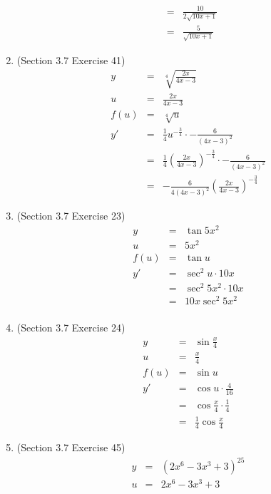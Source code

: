 \documentclass{article}
\begin{document}
\begin{enumerate}
\begin{eqnarray}
               &=& \frac{10}{2\sqrt{10x + 1}} \\
               &=& \frac{5}{\sqrt{10x + 1}}
        \end{eqnarray}
    \item (Section 3.7 Exercise 41)
        \begin{eqnarray}
            y &=& \sqrt[4]{\frac{2x}{4x-3}} \\
            u &=& \frac{2x}{4x-3} \\
            f(u) &=& \sqrt[4]{u} \\
            y' &=& \frac{1}{4}u^{-\frac{3}{4}} \cdot -\frac{6}{\left(4x-3\right)^2} \\
               &=& \frac{1}{4}\left(\frac{2x}{4x-3}\right)^{-\frac{3}{4}} \cdot -\frac{6}{\left(4x-3\right)^2} \\
               &=& -\frac{6}{4\left(4x-3\right)^2}\left(\frac{2x}{4x-3}\right)^{-\frac{3}{4}}
        \end{eqnarray}
    \item (Section 3.7 Exercise 23)
        \begin{eqnarray}
            y &=& \tan{5x^2} \\
            u &=& 5x^2 \\
            f(u) &=& \tan{u} \\
            y' &=& \sec^2{u} \cdot 10x \\
               &=& \sec^2{5x^2} \cdot 10x \\
               &=& 10x\sec^2{5x^2} \\
        \end{eqnarray}
    \item (Section 3.7 Exercise 24)
        \begin{eqnarray}
            y &=& \sin{\frac{x}{4}} \\
            u &=& \frac{x}{4} \\
            f(u) &=& \sin{u} \\
            y' &=& \cos{u} \cdot \frac{4}{16} \\
               &=& \cos{\frac{x}{4}} \cdot \frac{1}{4} \\
               &=& \frac{1}{4}\cos{\frac{x}{4}}
        \end{eqnarray}
    \item (Section 3.7 Exercise 45)
        \begin{eqnarray}
            y &=& (2x^6 - 3x^3 + 3)^{25} \\
            u &=& 2x^6 - 3x^3 + 3 \\

\end{eqnarray}
\end{enumerate}
\end{document}
